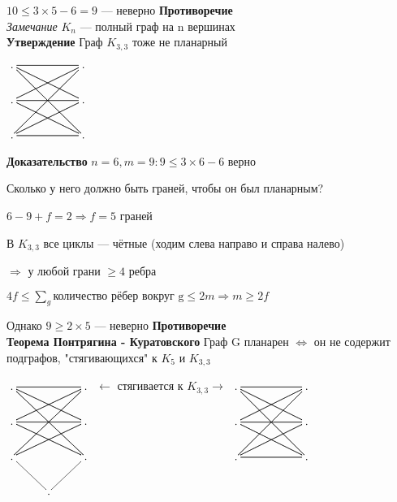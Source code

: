 \documentclass[a4paper, 12pt] {article}
\begin{document}
$ 10 \le 3 \times 5 - 6 = 9 $ --- неверно \textbf{Противоречие}\\


\textit{Замечание} $ K_{n} $ --- полный граф на n вершинах\\

\textbf{Утверждение} Граф $ K_{3,3} $ тоже не планарный

$\xymatrix{
	. \ar@{-}[rr] \ar@{-}[rrd] \ar@{-}[rrdd] & & . \ar@{-}[ll] \ar@{-}[lld] \ar@{-}[lldd]\\
	. \ar@{-}[rr] \ar@{-}[rrd] \ar@{-}[rru] & & . \ar@{-}[ll] \ar@{-}[lld] \ar@{-}[llu]\\
	. \ar@{-}[rr] \ar@{-}[rru] \ar@{-}[rruu] & & . \ar@{-}[ll] \ar@{-}[llu] \ar@{-}[lluu]\\
}$

\textbf{Доказательство} $ n=6, m=9: 9 \le 3 \times 6 - 6 $  верно

Сколько у него должно быть граней, чтобы он был планарным?

$ 6-9+f=2 \Rightarrow f=5 $ граней

В $ K_{3,3} $ все циклы --- чётные (ходим слева направо и справа налево)

$ \Rightarrow $ у любой грани $ \ge 4 $ ребра

$ 4f \le \sum_g \text{количество рёбер вокруг g} \le	2m \Rightarrow m \ge 2f$ 

Однако $ 9 \ge 2 \times 5 $ --- неверно \textbf{Противоречие}\\


\textbf{Теорема Понтрягина - Куратовского}
Граф G планарен $ \Leftrightarrow $ он не содержит подграфов, "стягивающихся" к $ K_{5} $ и $ K_{3,3} $ 

$\xymatrix{
	. \ar@{-}[rr] \ar@{-}[rrd] \ar@{-}[rrdd] & & . \ar@{-}[ll] \ar@{-}[lld] \ar@{-}[lldd]\\
	. \ar@{-}[rr] \ar@{-}[rrd] \ar@{-}[rru] & & . \ar@{-}[ll] \ar@{-}[lld] \ar@{-}[llu]\\
	. \ar@{-}[rd] \ar@{-}[rru] \ar@{-}[rruu] & & . \ar@{-}[ld] \ar@{-}[llu] \ar@{-}[lluu]\\
	& . &\\
}$ $ \leftarrow $ стягивается к $ K_{3,3} \rightarrow $
$\xymatrix{
	. \ar@{-}[rr] \ar@{-}[rrd] \ar@{-}[rrdd] & & . \ar@{-}[ll] \ar@{-}[lld] \ar@{-}[lldd]\\
	. \ar@{-}[rr] \ar@{-}[rrd] \ar@{-}[rru] & & . \ar@{-}[ll] \ar@{-}[lld] \ar@{-}[llu]\\
	. \ar@{-}[rr] \ar@{-}[rru] \ar@{-}[rruu] & & . \ar@{-}[ll] \ar@{-}[llu] \ar@{-}[lluu]\\
}$
\end{document}
